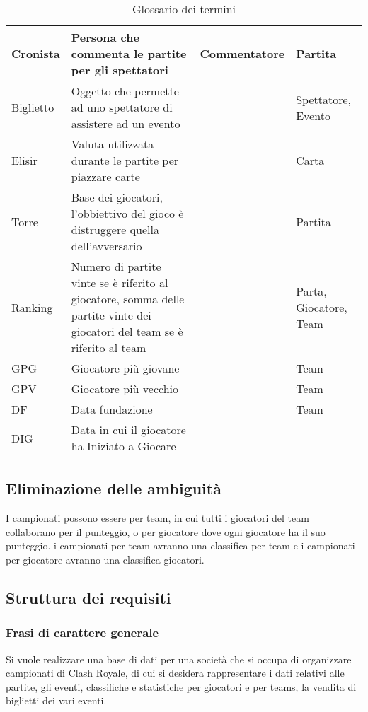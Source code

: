 \documentclass{article}
\begin{document}
\begin{table}
\begin{tabularx}{\textwidth}{|l|X|l|X|}
Cronista & Persona che commenta le partite per gli spettatori & Commentatore & Partita \\ \hline
Biglietto & Oggetto che permette ad uno spettatore di assistere ad un evento & & Spettatore, Evento \\ \hline
Elisir    & Valuta utilizzata durante le partite per piazzare carte & & Carta \\ \hline
Torre     & Base dei giocatori, l'obbiettivo del gioco è distruggere quella dell'avversario & & Partita \\ \hline
Ranking   & Numero di partite vinte se è riferito al giocatore, somma delle partite vinte dei giocatori del team se è riferito al team & & Parta, Giocatore, Team \\ \hline
GPG & Giocatore più giovane & & Team \\ \hline
GPV & Giocatore più vecchio & & Team \\ \hline
DF & Data fundazione & & Team \\ \hline
DIG & Data in cui il giocatore ha Iniziato a Giocare & & \\ \hline
\end{tabularx}
\caption{Glossario dei termini}
\label{table_glossario_termini}
\end{table}


\subsection{Eliminazione delle ambiguità}

I campionati possono essere per team, in cui tutti i giocatori del team collaborano per il punteggio, o per giocatore dove ogni giocatore ha il suo punteggio. i campionati per team avranno una classifica per team e i campionati per giocatore avranno una classifica giocatori.

\subsection{Struttura dei requisiti}

\subsubsection{Frasi di carattere generale}

Si vuole realizzare una base di dati per una società che si occupa di organizzare campionati di Clash Royale, di cui si desidera rappresentare i dati relativi alle partite, gli eventi, classifiche e statistiche per giocatori e per teams, la vendita di biglietti dei vari eventi.
\end{document}
